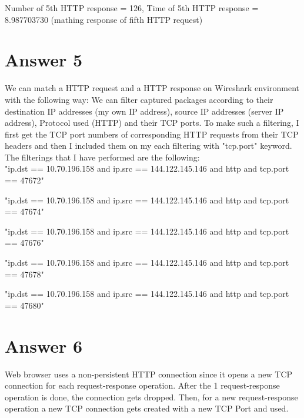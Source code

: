 \documentclass[10pt]{article}
\begin{document}
   Number of 5th HTTP response = 126, Time of 5th HTTP response = 8.987703730 (mathing response of fifth HTTP request)

\section*{Answer 5}
\hspace{4mm}	
We can match a HTTP request and a HTTP response on Wireshark environment with the following way:
   We can filter captured packages according to their destination IP addresses (my own IP address), source IP addresses (server IP address), Protocol used (HTTP) and their TCP ports.
   To make such a filtering, I first get the TCP port numbers of corresponding HTTP requests from their TCP headers
   and then I included them on my each filtering with "tcp.port" keyword. The filterings that I have performed are the following:\\
   
   "ip.dst == 10.70.196.158 and ip.src == 144.122.145.146 and http and tcp.port == 47672"
   
   "ip.dst == 10.70.196.158 and ip.src == 144.122.145.146 and http and tcp.port == 47674"

   "ip.dst == 10.70.196.158 and ip.src == 144.122.145.146 and http and tcp.port == 47676"

   "ip.dst == 10.70.196.158 and ip.src == 144.122.145.146 and http and tcp.port == 47678"

   "ip.dst == 10.70.196.158 and ip.src == 144.122.145.146 and http and tcp.port == 47680"


\section*{Answer 6}
\hspace{4mm}	
Web browser uses a non-persistent HTTP connection since it opens a new TCP connection for each request-response operation. After the 1 request-response operation is done, the connection gets dropped. Then, for a new request-response operation a new TCP connection gets created with a new TCP Port and used.  
\end{document}
